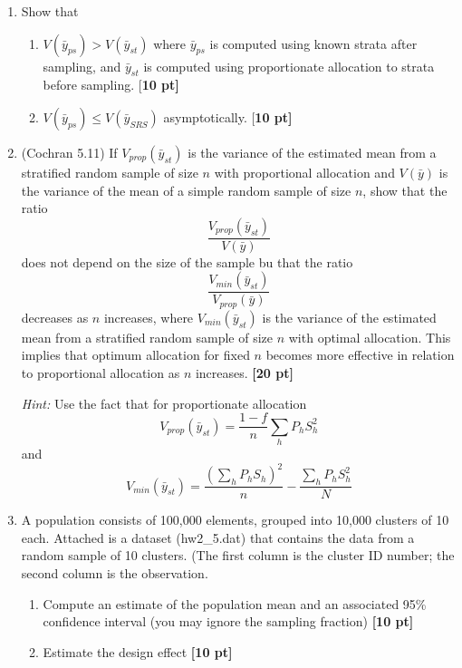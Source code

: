\documentclass[12pt]{article}
\begin{document}
\begin{enumerate}
\item Show that
	\begin{enumerate}
		\item $V(\bar y_{ps}) > V(\bar y_{st})$ where $\bar y_{ps}$ is computed using known strata after sampling, and $\bar y_{st}$ is computed using proportionate allocation to strata before sampling. {[\bf 10 pt]}
		\item $V(\bar y_{ps}) \leq V(\bar y_{SRS}) $ asymptotically. {[\bf 10 pt]}
	\end{enumerate}

\item (Cochran 5.11) If $V_{prop} (\bar y_{st})$ is the variance of the estimated mean from a stratified random sample of size $n$ with proportional allocation and $V(\bar y)$ is the variance of the mean of a simple random sample of size $n$, show that the ratio
$$
\frac{V_{prop} (\bar y_{st})}{V(\bar y)}
$$
does not depend on the size of the sample bu that the ratio
$$
\frac{V_{min} (\bar y_{st})}{V_{prop} (\bar y)}
$$
decreases as $n$ increases, where $V_{min} (\bar y_{st})$ is the variance of the estimated mean from a stratified random sample of size $n$ with optimal allocation.  This implies that optimum allocation for fixed $n$ becomes more effective in relation to proportional allocation as $n$ increases. {\bf [20 pt]}

{\it Hint:} Use the fact that for proportionate allocation
$$
V_{prop} (\bar y_{st}) = \frac{1-f}{n} \sum_h P_h S_h^2
$$
and
$$
V_{min} (\bar y_{st}) = \frac{\left( \sum_h P_h S_h \right)^2}{n} - \frac{\sum_h P_h S_h^2}{N}
$$

\item A population consists of 100,000 elements, grouped into 10,000 clusters of 10 each. Attached is a dataset (hw2\_5.dat) that contains the data from a random sample of 10 clusters. (The first column is the cluster ID number; the second column is the observation.
	\begin{enumerate}
		\item Compute an estimate of the population mean and an associated 95\% confidence interval (you may ignore the sampling fraction) {\bf [10 pt]}
		\item Estimate the design effect {\bf [10 pt]}
	\end{enumerate}

\end{enumerate}
\end{document}
